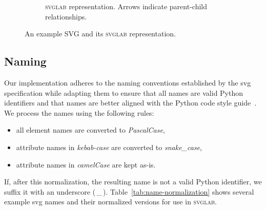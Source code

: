 \begin{figure}[H]
\begin{subfigure}{\textwidth}
    \caption{\textsc{svglab} representation. Arrows indicate parent-child relationships.}
  \end{subfigure}
  \caption{An example SVG and its \textsc{svglab} representation.}
  \label{fig:svg-representation}
\end{figure}

\subsection{Naming}

Our implementation adheres to the naming conventions established by the \gls{svg} specification while adapting them to ensure that all names are valid Python identifiers and that names are better aligned with the Python code style guide~\cite{pep8}. We process the names using the following rules:
\begin{itemize}
    \item all element names are converted to \emph{PascalCase},
    \item attribute names in \emph{kebab-case} are converted to \emph{snake\_case},
    \item attribute names in \emph{camelCase} are kept as-is.
\end{itemize}

If, after this normalization, the resulting name is not a valid Python identifier, we suffix it with an underscore (\,\_\,). Table~\ref{tab:name-normalization} shows several example \gls{svg} names and their normalized versions for use in \textsc{svglab}.

